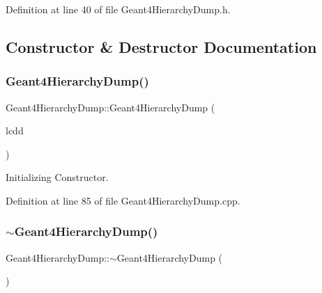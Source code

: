 Definition at line 40 of file Geant4\+Hierarchy\+Dump.\+h.



\subsection{Constructor \& Destructor Documentation}
\hypertarget{class_d_d4hep_1_1_simulation_1_1_geant4_hierarchy_dump_afcdcc1f61c37b8fcc8c005677b9c2383}{}\label{class_d_d4hep_1_1_simulation_1_1_geant4_hierarchy_dump_afcdcc1f61c37b8fcc8c005677b9c2383} 
\subsubsection{\texorpdfstring{Geant4\+Hierarchy\+Dump()}{Geant4HierarchyDump()}}
{\footnotesize\ttfamily Geant4\+Hierarchy\+Dump\+::\+Geant4\+Hierarchy\+Dump (\begin{DoxyParamCaption}\item[{\hyperlink{class_d_d4hep_1_1_simulation_1_1_geant4_hierarchy_dump_a4b0ebc3e2346d0ff1c40293d4610f560}{L\+C\+DD} \&}]{lcdd }\end{DoxyParamCaption})}



Initializing Constructor. 



Definition at line 85 of file Geant4\+Hierarchy\+Dump.\+cpp.

\hypertarget{class_d_d4hep_1_1_simulation_1_1_geant4_hierarchy_dump_a47d7985316101ad8cbe95c844746f847}{}\label{class_d_d4hep_1_1_simulation_1_1_geant4_hierarchy_dump_a47d7985316101ad8cbe95c844746f847} 
\subsubsection{\texorpdfstring{$\sim$\+Geant4\+Hierarchy\+Dump()}{~Geant4HierarchyDump()}}
{\footnotesize\ttfamily Geant4\+Hierarchy\+Dump\+::$\sim$\+Geant4\+Hierarchy\+Dump (\begin{DoxyParamCaption}{ }\end{DoxyParamCaption})\hspace{0.3cm}{\ttfamily [virtual]}}



